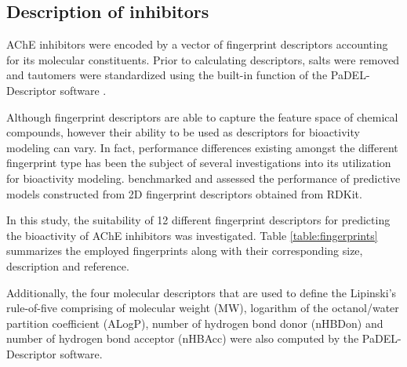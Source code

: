 \documentclass[fleqn,10pt]{wlpeerj}
\begin{document}
\subsection*{Description of inhibitors}

AChE inhibitors were encoded by a vector of fingerprint descriptors accounting for its molecular constituents. Prior to calculating descriptors, salts were removed and tautomers were standardized using the built-in function of the PaDEL-Descriptor software \citep{yap2011padel}.

Although fingerprint descriptors are able to capture the feature space of chemical compounds, however their ability to be used as descriptors for bioactivity modeling can vary. In fact, performance differences existing amongst the different fingerprint type has been the subject of several investigations into its utilization for bioactivity modeling. \cite{riniker2013open} benchmarked and assessed the performance of predictive models constructed from 2D fingerprint descriptors obtained from RDKit.

In this study, the suitability of 12 different fingerprint descriptors for predicting the bioactivity of AChE inhibitors was investigated. Table \ref{table:fingerprints} summarizes the employed fingerprints along with their corresponding size, description and reference.

Additionally, the four molecular descriptors that are used to define the Lipinski's rule-of-five comprising of molecular weight (MW), logarithm of the octanol/water partition coefficient (ALogP), number of hydrogen bond donor (nHBDon) and number of hydrogen bond acceptor (nHBAcc) were also computed by the PaDEL-Descriptor software.
\end{document}
